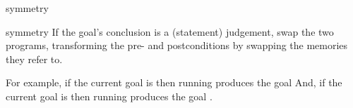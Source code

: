 \begin{tactic}{symmetry}
  \begin{tsyntax}{symmetry}
    If the goal's conclusion is a \prhl (statement) judgement, swap
    the two programs, transforming the pre- and postconditions by
    swapping the memories they refer to.

    \medskip For example, if the current goal is
     then
    running 
    produces the goal
    And, if the current goal is
     then
    running 
    produces the goal
    .
  \end{tsyntax}
\end{tactic}
